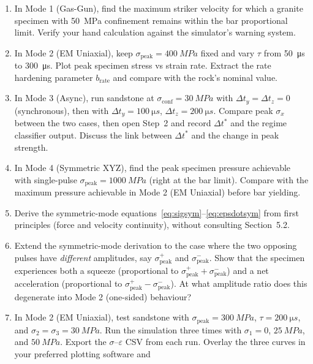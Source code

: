 \documentclass[11pt,a4paper]{article}
\providecommand{\SI}[2]{\qty{#1}{#2}}
\newcommand{\sig}{\sigma}
\newcommand{\eps}{\varepsilon}
\newcommand{\sigpeak}{\sig_{\text{peak}}}
\begin{document}
\begin{enumerate}[leftmargin=*, itemsep=4pt]
  \item In Mode 1 (Gas-Gun), find the maximum striker velocity for which a
        granite specimen with \SI{50}{MPa} confinement remains within the bar
        proportional limit. Verify your hand calculation against the
        simulator's warning system.
  \item In Mode 2 (EM Uniaxial), keep $\sigpeak = \SI{400}{MPa}$ fixed and
        vary $\tau$ from \SI{50}{\micro s} to \SI{300}{\micro s}. Plot peak specimen
        stress vs strain rate. Extract the rate hardening parameter
        $b_{\text{rate}}$ and compare with the rock's nominal value.
  \item In Mode 3 (Async), run sandstone at $\sig_{\text{conf}} = \SI{30}{MPa}$
        with $\Delta t_y = \Delta t_z = 0$ (synchronous), then with
        $\Delta t_y = \SI{100}{\micro s}$, $\Delta t_z = \SI{200}{\micro s}$.
        Compare peak $\sig_x$ between the two cases, then open Step~2 and
        record $\Delta t^\ast$ and the regime classifier output. Discuss the
        link between $\Delta t^\ast$ and the change in peak strength.
  \item In Mode 4 (Symmetric XYZ), find the peak specimen pressure achievable
        with single-pulse $\sigpeak = \SI{1000}{MPa}$ (right at the bar limit).
        Compare with the maximum pressure achievable in Mode 2 (EM Uniaxial)
        before bar yielding.
  \item Derive the symmetric-mode equations~\eqref{eq:sigsym}--\eqref{eq:epsdotsym}
        from first principles (force and velocity continuity), without
        consulting Section~5.2.
  \item Extend the symmetric-mode derivation to the case where the two
        opposing pulses have \emph{different} amplitudes, say $\sigpeak^+$
        and $\sigpeak^-$. Show that the specimen experiences both a squeeze
        (proportional to $\sigpeak^+ + \sigpeak^-$) and a net acceleration
        (proportional to $\sigpeak^+ - \sigpeak^-$). At what amplitude ratio
        does this degenerate into Mode 2 (one-sided) behaviour?
  \item In Mode 2 (EM Uniaxial), test sandstone with $\sigpeak = \SI{300}{MPa}$,
        $\tau = \SI{200}{\micro s}$, and $\sig_2 = \sig_3 = \SI{30}{MPa}$.
        Run the simulation three times with $\sig_1 = 0$, $\SI{25}{MPa}$,
        and $\SI{50}{MPa}$. Export the $\sig$--$\eps$ CSV from each run.
        Overlay the three curves in your preferred plotting software and

\end{enumerate}
\end{document}
